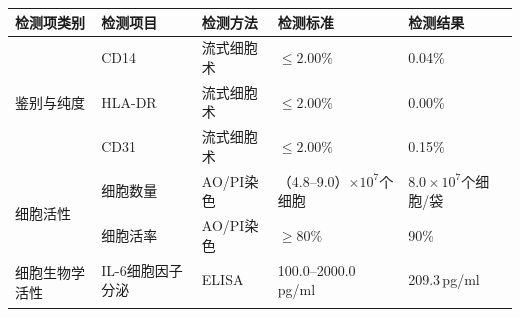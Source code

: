 \documentclass[UTF8,10pt,a4paper,fontset=fandol]{ctexart}
\newcommand{\fieldvalue}[1]{#1}
\begin{document}
\small
\begin{tabular}{|p{1.8cm}|p{3.0cm}|p{2.6cm}|p{3.5cm}|p{3.0cm}|}
\hline
检测项类别 & 检测项目 & 检测方法 & 检测标准 & 检测结果
\\ \hline
\multirow{3}{*}{鉴别与纯度}
& 
\fieldvalue{CD14}
&
\fieldvalue{流式细胞术}
&
\fieldvalue{$\leq 2.00\%$}
&
\fieldvalue{0.04\%}
\\ \cline{2-5}
&
\fieldvalue{HLA-DR}
&
\fieldvalue{流式细胞术}
&
\fieldvalue{$\leq 2.00\%$}
&
\fieldvalue{0.00\%}
\\ \cline{2-5}
&
\fieldvalue{CD31}
&
\fieldvalue{流式细胞术}
&
\fieldvalue{$\leq 2.00\%$}
&
\fieldvalue{0.15\%}
\\ \hline
\multirow{2}{*}{细胞活性}
&
\fieldvalue{细胞数量}
&
\fieldvalue{AO/PI染色}
&
\fieldvalue{（4.8--9.0）$\times10^{7}$个细胞}
&
\fieldvalue{$8.0\times10^{7}$个细胞/袋}
\\ \cline{2-5}
&
\fieldvalue{细胞活率}
&
\fieldvalue{AO/PI染色}
&
\fieldvalue{$\geq 80\%$}
&
\fieldvalue{90\%}
\\ \hline
\multirow{3}{*}{细胞生物学活性}
&
\fieldvalue{IL-6细胞因子分泌}
&
\fieldvalue{ELISA}
&
\fieldvalue{100.0--2000.0\,pg/ml}
&
\fieldvalue{209.3\,pg/ml}
\\ \cline{2-5}
&

\end{tabular}
\end{document}
